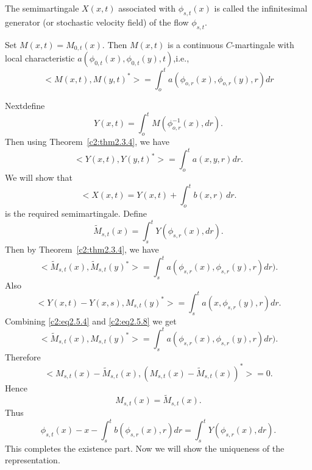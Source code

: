 \setcounter{definition}{1}
\begin{definition}\label{c2:def2.5.2}%
  The semimartingale $X(x, t)$ associated with $\phi_{s, t}(x)$ is
  called the infinitesimal generator (or stochastic velocity field) of
  the flow $\phi_{s,t}$. 
\end{definition}


\begin{proofoftheorem}\label{c2:prfthm2.5.1}%
  Set $M(x,t)=M_{0,t}(x)$. Then $M(x,t)$ is a continuous
  $C$-martingale with local characteristic $a
  (\phi_{0,t}(x),\phi_{0,t}(y),t)$,i.e.,  
  \begin{equation*} 
    <M(x,t),M(y,t)^*> = \int^t_o a(\phi_{o,r}(x),\phi_{o,r}(y),r)dr
    \tag{2.5.2}\label{c2:eq2.5.2} 
  \end{equation*}
\end{proofoftheorem}

Next\pageoriginale define
\begin{equation*}
Y(x,t)= \int^t_o M(\phi^{-1}_{o,r}(x),dr). 
\tag{2.5.3}\label{c2:eq2.5.3}
\end{equation*}
Then using Theorem~\ref{c2:thm2.3.4}, we have 
\begin{equation*}
< Y(x,t),Y(y,t)^* >=  \int^t_o a(x,y,r)dr. 
\tag{2.5.4}\label{c2:eq2.5.4}
\end{equation*}
We will show that 
\begin{equation*}
< X(x,t)=Y(x,t) + \int^t_o b(x,r) \, dr. 
\tag{2.5.5}\label{c2:eq2.5.5}
\end{equation*}
is the required semimartingale. Define
\begin{equation*}
  \tilde{M}_{s,t}(x)=  \int^t_s Y( \phi_{s,r}(x),dr). 
\tag{2.5.6}\label{c2:eq2.5.6}
\end{equation*}
Then by Theorem~\ref{c2:thm2.3.4}, we have 
\begin{equation*}
< \tilde{M}_{s,t}(x),\tilde{M}_{s,t}(y)^* > =  \int^t_s a(
\phi_{s,r}(x),\phi_{s,r}(y),r)dr). \tag{2.5.7}\label{c2:eq2.5.7} 
\end{equation*}
Also
\begin{equation*}
< Y(x,t)-Y(x,s),M_{s,t}(y)^* > =  \int^t_s a(x,
\phi_{s,r}(y),r)dr. \tag{2.5.8}\label{c2:eq2.5.8} 
\end{equation*}
Combining \eqref{c2:eq2.5.4} and \eqref{c2:eq2.5.8} we get
\begin{equation*}
  < \tilde{M}_{s,t}(x),M_{s,t}(y)^* > =  \int^t_s a(
  \phi_{s,r}(x),\phi_{s,r}(y),r)dr). \tag{2.5.9} \label{c2:eq2.5.9}
\end{equation*}
Therefore
$$
<M_{s,t}(x)-\tilde{M}_{s,t}(x),(M_{s,t}(x)-\tilde{M}_{s,t}(x))^* >=0. 
$$
Hence
$$
M_{s,t}(x)=\tilde{M}_{s,t}(x).
$$
Thus\pageoriginale 
$$
\phi_{s,t}(x)-x-\int^t_s b(\phi_{s,r}(x),r)dr = \int^t_s Y(\phi_{s,r}(x),dr).
$$
This completes the existence part. Now we will show the uniqueness of
the representation. 

